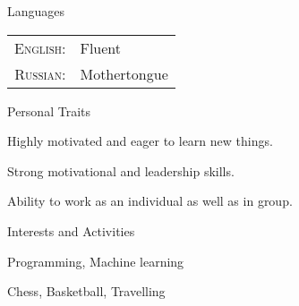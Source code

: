 \documentclass{resume} %
\begin{document}
\begin{rSection}{Languages}
\begin{tabular}{rl}
\textsc{English:} & Fluent\\

\textsc{Russian:} & Mothertongue\\

\end{tabular}
\end{rSection}

\begin{rSection}{Personal Traits}
\item Highly motivated and eager to learn new things.
\item Strong motivational and leadership skills.
\item Ability to work as an individual as well as in group.
\end{rSection}

\begin{rSection}{Interests and Activities}

\item Programming, Machine learning
\item Chess, Basketball, Travelling

\end{rSection}
\end{document}
